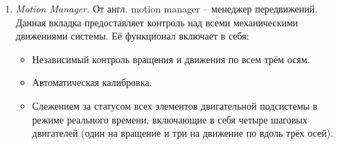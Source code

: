 \begin{enumerate}
\item \emph{Motion Manager.} От англ. motion manager -- менеджер передвижений. Данная вкладка предоставляет контроль над всеми механическими движениями системы. Её функционал включает в себя:

\begin{itemize}
\setlength\itemsep{-0.5em}
\item Независимый контроль вращения и движения по всем трём осям.
\item Автоматическая калибровка.
\item Слежением за статусом всех элементов двигательной подсистемы в режиме реального времени, включающие в себя четыре шаговых двигателей (один на вращение и три на движение по вдоль трёх осей).
\end{itemize}
\end{enumerate}


